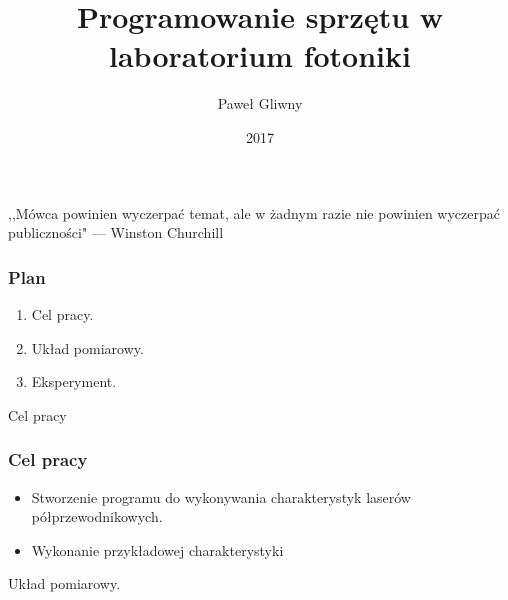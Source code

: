 \documentclass[xcolor={dvipsnames,table}]{beamer}
\title{Programowanie sprzętu w laboratorium fotoniki}
\author{Paweł Gliwny}
\institute{Instytut Fizyki \\ Politechnika Łódzka}
\date{2017}
\begin{document}
\frame{\titlepage}

\begin{frame}
\begin{Large}
\begin{center}
,,Mówca powinien wyczerpać temat, ale w żadnym razie nie powinien wyczerpać publiczności" --- Winston Churchill
\end{center}
\end{Large}
\end{frame}

\begin{frame}
\frametitle{Plan}
\begin{enumerate}
\item Cel pracy.
\item Układ pomiarowy.
\item Eksperyment.
\end{enumerate}
\end{frame}

\begin{frame}
\begin{Huge}
\begin{center}
Cel pracy
\end{center}
\end{Huge}
\end{frame}

\begin{frame}
\frametitle{Cel pracy}
\begin{itemize}
\item Stworzenie programu do wykonywania charakterystyk laserów półprzewodnikowych.
\item Wykonanie przykładowej charakterystyki
\end{itemize}
\end{frame}

\begin{frame}
\begin{Huge}
\begin{center}
Układ pomiarowy.
\end{center}
\end{Huge}
\end{frame}
\end{document}

